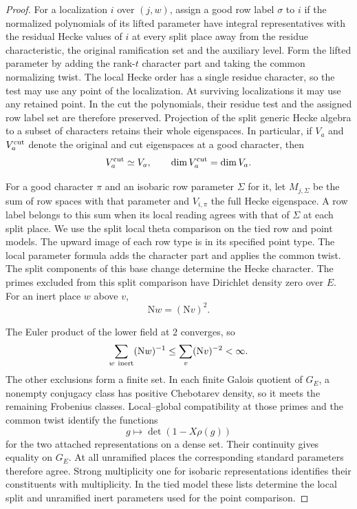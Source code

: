 \begin{proof}
For a localization \(i\) over \((j,w)\), assign a good
row label \(\sigma\) to \(i\) if the normalized polynomials
of its lifted parameter have integral representatives with
the residual Hecke values of \(i\) at every split place
away from the residue characteristic, the original
ramification set and the auxiliary level. Form the lifted
parameter by adding the rank-\(t\) character part and
taking the common normalizing twist. The local Hecke order
has a single residue character, so the test may use any
point of the localization. At surviving localizations it
may use any retained point. In the cut the polynomials,
their residue test and the assigned row label set are
therefore preserved. Projection of the split generic Hecke
algebra to a subset of characters retains their whole
eigenspaces. In particular, if \(V_a\) and \(V_a^{\rm cut}\) denote the original and cut eigenspaces at a good character, then
\[
 V_a^{\rm cut}\simeq V_a,\qquad \dim V_a^{\rm cut}=\dim V_a.
\]


For a good character \(\pi\) and an isobaric row parameter
\(\Sigma\) for it, let \(M_{j,\Sigma}\) be the sum of row
spaces with that parameter and \(V_{i,\pi}\) the full
Hecke eigenspace. A row label belongs to this sum when its
local reading agrees with that of \(\Sigma\) at each split
place. We use the split local theta comparison
on the tied row and point models. The upward image of each
row type is in its specified point type. The local parameter
formula adds the character part and applies the common twist.
The split components of this base change determine the
Hecke character. The primes excluded from this split comparison have
Dirichlet density zero over \(E\).
For an inert place \(w\) above \(v\),
\[
 \mathrm Nw=(\mathrm Nv)^2.
\]

The Euler product of the lower field at \(2\) converges, so
\[
 \sum_{w\ {\rm inert}}(\mathrm Nw)^{-1}
   \le\sum_{v}(\mathrm Nv)^{-2}<\infty .
\]
The other exclusions form a finite set. In each finite Galois quotient
of \(G_E\), a nonempty conjugacy class has positive
Chebotarev density, so it meets the remaining Frobenius
classes. Local--global compatibility at those primes
and the common twist identify the functions
\[
       g\longmapsto \det(1-X\rho(g))
\]
for the two attached representations on a dense set.
Their continuity gives equality on \(G_E\). At all
unramified places the corresponding standard parameters
therefore agree. Strong multiplicity one for isobaric
representations identifies their constituents with multiplicity.
In the tied model these lists determine the local split
and unramified inert parameters used for the point
comparison.


\end{proof}
